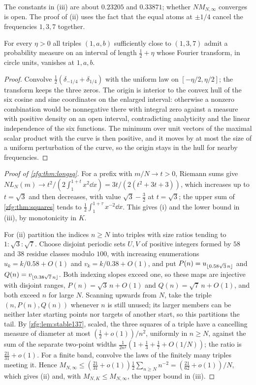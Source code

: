The constants in (iii) are about $0.23205$ and $0.33871$; whether $NM_{N,\infty}$ converges is open. The proof of (ii) uses the
fact that the equal atoms at $\pm1/4$ cancel the frequencies $1,3,7$ together.

\begin{lemma}\label{zfg:lem:stable137}
For every $\eta>0$ all triples $(1,a,b)$ sufficiently close to $(1,3,7)$ admit a probability measure on an interval of
length $\tfrac12+\eta$ whose Fourier transform, in circle units, vanishes at $1,a,b$.
\end{lemma}

\begin{proof}
Convolve $\tfrac12(\delta_{-1/4}+\delta_{1/4})$ with the uniform law on $[-\eta/2,\eta/2]$; the transform keeps the three zeros.
The origin is interior to the convex hull of the six cosine and sine coordinates on the enlarged interval:
otherwise a nonzero combination would be nonnegative there with integral zero against a measure with positive
density on an open interval, contradicting analyticity and the linear independence of the six functions. The
minimum over unit vectors of the maximal scalar product with the curve is then positive, and it moves by at most
the size of a uniform perturbation of the curve, so the origin stays in the hull for nearby frequencies.
\end{proof}

\begin{proof}[Proof of \cref{zfg:thm:longsq}]
For a prefix with $m/N\to t>0$, Riemann sums give $NL_N(m)\to t^2/(2\int_1^{1+t}x^2\dd x)=3t/(2(t^2+3t+3))$, which increases
up to $t=\sqrt3$ and then decreases, with value $\sqrt3-\tfrac32$ at $t=\sqrt3$; the upper sum of \cref{zfg:thm:squares} tends
to $\tfrac12\int_1^{1+\tau}x^{-2}\dd x$. This gives (i) and the lower bound in (iii), by monotonicity in $K$.

For (ii) partition the indices $n\ge N$ into triples with size ratios tending to $1:\sqrt3:\sqrt7$. Choose disjoint
periodic sets $U,V$ of positive integers formed by $58$ and $38$ residue classes modulo $100$, with increasing
enumerations $u_k=k/0.58+O(1)$ and $v_k=k/0.38+O(1)$, and put $P(n)=u_{\lfloor0.58\sqrt3\,n\rfloor}$ and $Q(n)=v_{\lfloor0.38\sqrt7\,n\rfloor}$.
Both indexing slopes exceed one, so these maps are injective with disjoint ranges, $P(n)=\sqrt3\,n+O(1)$ and
$Q(n)=\sqrt7\,n+O(1)$, and both exceed $n$ for large $N$. Scanning upwards from $N$, take the triple $(n,P(n),Q(n))$ whenever
$n$ is still unused; its larger members can be neither later starting points nor targets of another start, so this
partitions the tail. By \cref{zfg:lem:stable137}, scaled, the three squares of a triple have a cancelling measure of
diameter at most $(\tfrac12+o(1))/n^2$, uniformly in $n\ge N$, against the sum of the separate two-point widths
$\tfrac1{2n^2}(1+\tfrac13+\tfrac17+O(1/N))$; the ratio is $\tfrac{21}{31}+o(1)$. For a finite band, convolve the laws of the
finitely many triples meeting it. Hence $M_{N,\infty}\le(\tfrac{21}{31}+o(1))\tfrac12\sum_{n\ge N}n^{-2}=(\tfrac{21}{62}+o(1))/N$, which gives
(ii) and, with $M_{N,K}\le M_{N,\infty}$, the upper bound in (iii).
\end{proof}

